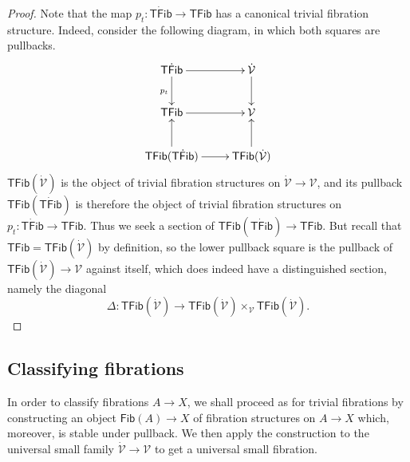 \documentclass[12pt]{article}
\newcommand{\ra}{\ensuremath{\rightarrow}}
\newcommand{\V}{\ensuremath{\mathcal{V}}}
\newcommand{\VV}{\ensuremath{\dot{\mathcal{V}}}}
\newcommand{\Fib}{\ensuremath{\mathsf{Fib}}}
\newcommand{\TFib}{\ensuremath{\mathsf{TFib}}}
\newcommand{\TTFib}{\ensuremath{\dot{\mathsf{TFib}}}}
\theoremstyle{remark}
\theoremstyle{definition}
\begin{document}
\begin{proof}
Note that the map $p_t : \TTFib\ra\TFib$ has a canonical trivial fibration structure. Indeed, consider the following diagram, in which both squares are pullbacks.
\begin{equation}\label{diagram:fibisfib}
\xymatrix{
\TTFib \ar[d]_{p_t} \ar[r]  & \VV \ar[d]\\
\TFib \ar[r] & \V\\
\TFib(\TTFib) \ar[u] \ar[r] & \TFib(\VV)\ar[u].
}
\end{equation}
$\TFib(\VV)$ is the object of trivial fibration structures on $\VV\ra\V$, and its pullback $\TFib(\TTFib)$ is therefore the object of trivial fibration structures on $p_t : \TTFib\ra\TFib$.  Thus we seek a section of $\TFib(\TTFib) \ra \TFib$.  But recall that $\TFib = \TFib(\VV)$ by definition, so the lower pullback square is the pullback of $\TFib(\VV)\ra \V$ against itself, which does indeed have a distinguished section, namely the diagonal
\[
\Delta : \TFib(\VV) \ra \TFib(\VV)\times_\V\TFib(\VV).
\]
\end{proof}

\subsection{Classifying fibrations}

In order to classify fibrations $A\ra X$, we shall proceed as for trivial fibrations by constructing an object $\Fib(A)\ra X$ of fibration structures on $A\ra X$ which, moreover, is stable under pullback.  We then apply the construction to the universal small family $\VV\ra\V$ to get a universal small fibration.  
\end{document}
